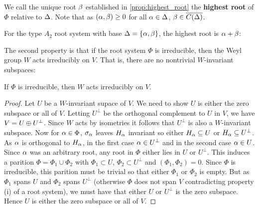 \documentclass[12pt,reqno,oneside]{amsart}
\begin{document}
    We call the unique root $\beta$ established in \cref{prop:highest_root} the \textbf{highest root} of $\Phi$ relative to $\Delta$. Note that as $(\alpha,\beta) \ge 0$ for all $\alpha \in \Delta$, $\beta \in \overline{C(\Delta)}$.

    For the type $A_{2}$ root system with base $\Delta = \{\alpha,\beta\}$, the highest root is $\alpha+\beta$:
    
    \begin{center}
    \end{center}

    The second property is that if the root system $\Phi$ is irreducible, then the Weyl group $W$ acts irreducibly on $V$. That is, there are no nontrivial $W$-invariant subspaces:

    \begin{proposition}\label{prop:Weyl_group_acts_irreducibly}
        If $\Phi$ is irreducible, then $W$ acts irreducibly on $V$.
    \end{proposition}
    \begin{proof}
        Let $U$ be a $W$-invariant supace of $V$. We need to show $U$ is either the zero subspace or all of $V$. Letting $U^{\perp}$ be the orthogonal complement to $U$ in $V$, we have $V = U \oplus U^{\perp}$. Since $W$ acts by isometries it follows that $U^{\perp}$ is also a $W$-invariant subspace. Now for $\alpha \in \Phi$, $\sigma_{\alpha}$ leaves $H_{\alpha}$ invariant so either $H_{\alpha} \subseteq U$ or $H_{\alpha} \subseteq U^{\perp}$. As $\alpha$ is orthogonal to $H_{\alpha}$, in the first case $\alpha \in U^{\perp}$ and in the second case $\alpha \in U$. Since $\alpha$ was an arbitrary root, any root in $\Phi$ either lies in $U$ or $U^{\perp}$. This induces a parition $\Phi = \Phi_{1} \cup \Phi_{2}$ with $\Phi_{1} \subset U$, $\Phi_{2} \subset U^{\perp}$ and $(\Phi_{1},\Phi_{2}) = 0$. Since $\Phi$ is irreducible, this parition must be trivial so that either $\Phi_{1}$ or $\Phi_{2}$ is empty. But as $\Phi_{1}$ spans $U$ and $\Phi_{2}$ spans $U^{\perp}$ (otherwise $\Phi$ does not span $V$ contradicting property (i) of a root system), we must have that either $U$ or $U^{\perp}$ is the zero subspace. Hence $U$ is either the zero subspace or all of $V$.
    \end{proof}
\end{document}
